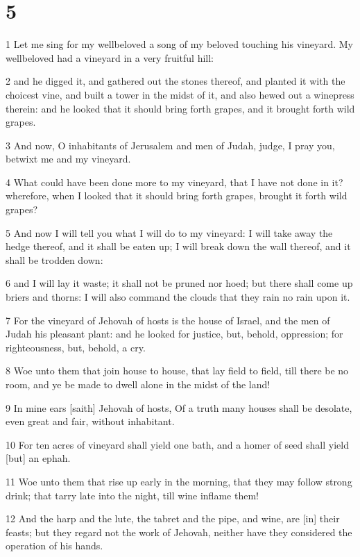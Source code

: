 \chapter{5}

\par 1 Let me sing for my wellbeloved a song of my beloved touching his vineyard. My wellbeloved had a vineyard in a very fruitful hill:
\par 2 and he digged it, and gathered out the stones thereof, and planted it with the choicest vine, and built a tower in the midst of it, and also hewed out a winepress therein: and he looked that it should bring forth grapes, and it brought forth wild grapes.
\par 3 And now, O inhabitants of Jerusalem and men of Judah, judge, I pray you, betwixt me and my vineyard.
\par 4 What could have been done more to my vineyard, that I have not done in it? wherefore, when I looked that it should bring forth grapes, brought it forth wild grapes?
\par 5 And now I will tell you what I will do to my vineyard: I will take away the hedge thereof, and it shall be eaten up; I will break down the wall thereof, and it shall be trodden down:
\par 6 and I will lay it waste; it shall not be pruned nor hoed; but there shall come up briers and thorns: I will also command the clouds that they rain no rain upon it.
\par 7 For the vineyard of Jehovah of hosts is the house of Israel, and the men of Judah his pleasant plant: and he looked for justice, but, behold, oppression; for righteousness, but, behold, a cry.
\par 8 Woe unto them that join house to house, that lay field to field, till there be no room, and ye be made to dwell alone in the midst of the land!
\par 9 In mine ears [saith] Jehovah of hosts, Of a truth many houses shall be desolate, even great and fair, without inhabitant.
\par 10 For ten acres of vineyard shall yield one bath, and a homer of seed shall yield [but] an ephah.
\par 11 Woe unto them that rise up early in the morning, that they may follow strong drink; that tarry late into the night, till wine inflame them!
\par 12 And the harp and the lute, the tabret and the pipe, and wine, are [in] their feasts; but they regard not the work of Jehovah, neither have they considered the operation of his hands.
